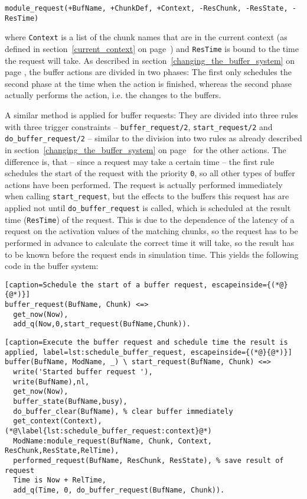 \begin{lstlisting}[label=lst:imodule_final, caption={The final version of the interface \emph{IModule}}]
module_request(+BufName, +ChunkDef, +Context, -ResChunk, -ResState, -ResTime) 
\end{lstlisting}

where \lstinline|Context| is a list of the chunk names that are in the current context (as defined in section~\ref{current_context} on page~\pageref{current_context}) and \lstinline|ResTime| is bound to the time the request will take. As described in section~\ref{changing_the_buffer_system} on page \pageref{changing_the_buffer_system}, the buffer actions are divided in two phases: The first only schedules the second phase at the time when the action is finished, whereas the second phase actually performs the action, i.e. the changes to the buffers.

A similar method is applied for buffer requests: They are divided into three rules with three trigger constraints -- \lstinline|buffer_request/2|, \lstinline|start_request/2| and \lstinline|do_buffer_request/2| -- similar to the division into two rules as already described in section~\ref{changing_the_buffer_system} on page~\pageref{changing_the_buffer_system} for the other actions. The difference is, that -- since a request may take a certain time -- the first rule schedules the start of the request with the priority \lstinline|0|, so all other types of buffer actions have been performed. The request is actually performed immediately when calling \lstinline|start_request|, but the effects to the buffers this request has are applied not until \lstinline|do_buffer_request| is called, which is scheduled at the result time (\lstinline|ResTime|) of the request. This is due to the dependence of the latency of a request on the activation values of the matching chunks, so the request has to be performed in advance to calculate the correct time it will take, so the result has to be known before the request ends in simulation time. This yields the following code in the buffer system:

\begin{lstlisting}[caption=Schedule the start of a buffer request, escapeinside={(*@}{@*)}]
buffer_request(BufName, Chunk) <=>
  get_now(Now),
  add_q(Now,0,start_request(BufName,Chunk)).
\end{lstlisting}

\begin{lstlisting}[caption=Execute the buffer request and schedule time the result is applied, label=lst:schedule_buffer_request, escapeinside={(*@}{@*)}]
buffer(BufName, ModName, _) \ start_request(BufName, Chunk) <=> 
  write('Started buffer request '),
  write(BufName),nl,
  get_now(Now),
  buffer_state(BufName,busy),
  do_buffer_clear(BufName), % clear buffer immediately
  get_context(Context), (*@\label{lst:schedule_buffer_request:context}@*)
  ModName:module_request(BufName, Chunk, Context, ResChunk,ResState,RelTime),
  performed_request(BufName, ResChunk, ResState), % save result of request
  Time is Now + RelTime, 
  add_q(Time, 0, do_buffer_request(BufName, Chunk)).
\end{lstlisting}

